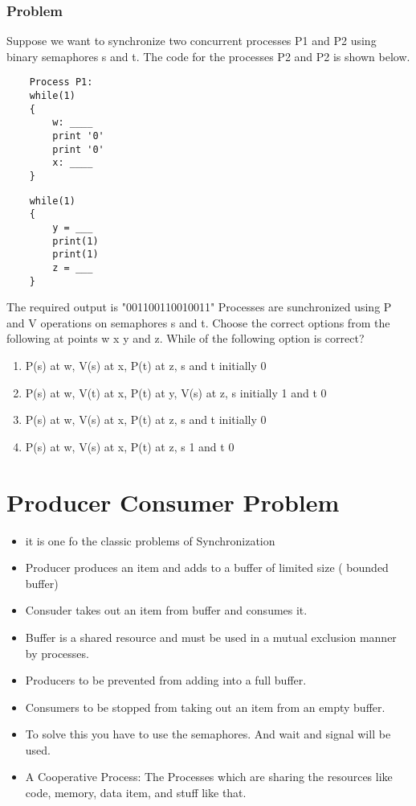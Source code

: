 \documentclass[11pt]{article}
\begin{document}
\subsubsection{Problem}
Suppose we want to synchronize two concurrent processes P1 and P2 using binary semaphores s and t. The code for the processes P2 and P2 is shown below.

\begin{verbatim}
	Process P1: 
	while(1)
	{
		w: ____
		print '0'
		print '0'
		x: ____
	}
\end{verbatim}

\begin{verbatim}
	while(1)
	{
		y = ___
		print(1)
		print(1)
		z = ___
	}
\end{verbatim}

The required output is "001100110010011" Processes are sunchronized using P and V operations on semaphores s and t. Choose the correct options from the following at points w x y and z. While of the following option is correct?
\begin{enumerate}
	\item P(s) at w, V(s) at x, P(t) at z, s and t initially 0
	\item P(s) at w, V(t) at x, P(t) at y, V(s) at z, s initially 1 and t 0
	\item P(s) at w, V(s) at x, P(t) at z, s and t initially 0
	\item P(s) at w, V(s) at x, P(t) at z, s 1 and t 0

\end{enumerate}

\section{Producer Consumer Problem}
\begin{itemize}
	\item it is one fo the classic problems of Synchronization
	\item Producer produces an item and adds to a buffer of limited size ( bounded buffer)
	\item Consuder takes out an item from buffer and consumes it. 
	\item Buffer is a shared resource and must be used in a mutual exclusion manner by processes. 
	\item Producers to be prevented from adding into a full buffer. 
	\item Consumers to be stopped from taking out an item from an empty buffer. 
	\item To solve this you have to use the semaphores. And wait and signal will be used. 
	\item A Cooperative Process: The Processes which are sharing the resources like code, memory, data item, and stuff like that. 
\end{itemize}
\end{document}
